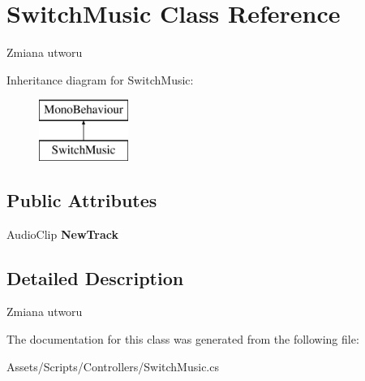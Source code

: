 \hypertarget{class_switch_music}{}\section{Switch\+Music Class Reference}
\label{class_switch_music}


Zmiana utworu  


Inheritance diagram for Switch\+Music\+:\begin{figure}[H]
\begin{center}
\leavevmode
\includegraphics[height=2.000000cm]{class_switch_music}
\end{center}
\end{figure}
\subsection*{Public Attributes}
\begin{DoxyCompactItemize}
\item 
\mbox{\label{class_switch_music_aaead7b595a4b2352367a4479f40f4981}} 
Audio\+Clip {\bfseries New\+Track}
\end{DoxyCompactItemize}


\subsection{Detailed Description}
Zmiana utworu 



The documentation for this class was generated from the following file\+:\begin{DoxyCompactItemize}
\item 
Assets/\+Scripts/\+Controllers/Switch\+Music.\+cs\end{DoxyCompactItemize}
